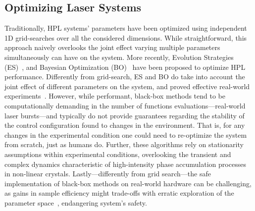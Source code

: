 \subsection{Optimizing Laser Systems}
Traditionally, HPL systems' parameters have been optimized using independent 1D grid-searches over all the considered dimensions. While straightforward, this approach naively overlooks the joint effect varying multiple parameters simultaneously can have on the system. More recently, Evolution Strategies (ES)~\citep{baumert1997femtosecond, arteaga2014supercontinuum, woodward2016towards}, and Bayesian Optimization (BO)~\citep{loughran2023automated, shalloo2020automation, capuano2022laser, anjum2024high} have been proposed to optimize HPL performance. Differently from grid-search, ES and BO do take into account the joint effect of different parameters on the system, and proved effective real-world experiments~\citep{shalloo2020automation}. However, while performant, black-box methods tend to be computationally demanding in the number of functions evaluations---real-world laser bursts---and typically do not provide guarantees regarding the stability of the control configuration found to changes in the environment. That is, for any changes in the experimental condition one could need to re-optimize the system from scratch, just as humans do. Further, these algorithms rely on stationarity assumptions within experimental conditions, overlooking the transient and complex dynamics characteristic of high-intensity phase accumulation processes in non-linear crystals. Lastly---differently from grid search---the safe implementation of black-box methods on real-world hardware can be challenging, as gains in sample efficiency might trade-offs with erratic exploration of the parameter space~\citep{capuano2023temporl}, endangering system's safety. 


